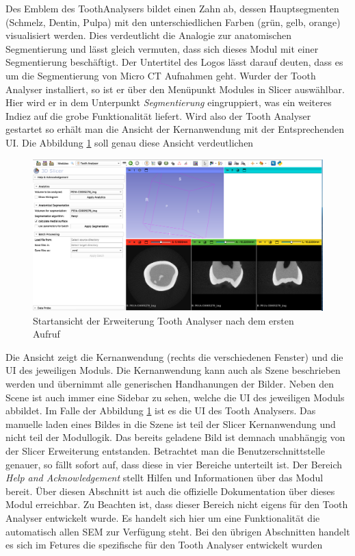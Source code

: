Des Emblem des ToothAnalysers bildet einen Zahn ab, dessen Hauptsegmenten (Schmelz,
Dentin, Pulpa) mit den unterschiedlichen Farben (grün, gelb, orange) visualisiert
werden. Dies verdeutlicht die Analogie zur anatomischen Segmentierung und lässt
gleich vermuten, dass sich dieses Modul mit einer Segmentierung beschäftigt. Der
Untertitel des Logos lässt darauf deuten, dass es um die Segmentierung von Micro
\ac{CT} Aufnahmen geht. Wurder der Tooth Analyser installiert, so ist er über
den Menüpunkt Modules in Slicer auswählbar. Hier wird er in dem Unterpunkt \textit{Segmentierung}
eingruppiert, was ein weiteres Indiez auf die grobe Funktionalität liefert. Wird
also der Tooth Analyser gestartet so erhält man die Ansicht der Kernanwendung
mit der Entsprechenden \ac{UI}. Die Abbildung \ref{fig:tooth_analyser_start_up}
soll genau diese Ansicht verdeutlichen

\begin{figure}[h]
	\centering
	\includegraphics[scale=0.2, width=\textwidth]{img/toothAnalyserStarUp.png}
	\caption{Startansicht der Erweiterung Tooth Analyser nach dem ersten Aufruf}
	\label{fig:tooth_analyser_start_up}
\end{figure}

Die Ansicht zeigt die Kernanwendung (rechts die verschiedenen Fenster) und die
\ac{UI} des jeweiligen Moduls. Die Kernanwendung kann auch als Szene beschrieben
werden und übernimmt alle generischen Handhanungen der Bilder. Neben den Scene ist
auch immer eine Sidebar zu sehen, welche die \ac{UI} des jeweiligen Moduls abbildet.
Im Falle der Abbildung \ref{fig:tooth_analyser_start_up} ist es die \ac{UI} des Tooth
Analysers. Das manuelle laden eines Bildes in die Szene ist teil der Slicer
Kernanwendung und nicht teil der Modullogik. Das bereits geladene Bild ist demnach
unabhängig von der Slicer Erweiterung entstanden. Betrachtet man die
Benutzerschnittstelle genauer, so fällt sofort auf, dass diese in vier Bereiche
unterteilt ist. Der Bereich \textit{Help and Acknowledgement} stellt Hilfen und
Informationen über das Modul bereit. Über diesen Abschnitt ist auch die offizielle
Dokumentation über dieses Modul erreichbar. Zu Beachten ist, dass dieser Bereich
nicht eigens für den Tooth Analyser entwickelt wurde. Es handelt sich hier um
eine Funktionalität die automatisch allen \ac{SEM} zur Verfügung steht. Bei den
übrigen Abschnitten handelt es sich im Fetures die spezifische für den Tooth
Analyser entwickelt wurden

